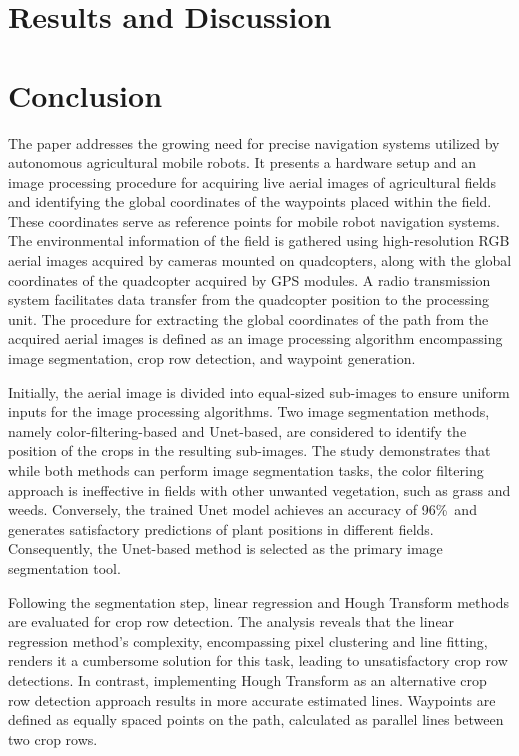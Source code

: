 \documentclass[conference]{IEEEtran}
\begin{document}
\section{Results and Discussion}\label{Results and Discussion}




\section{Conclusion}\label{Conclusion}
The paper addresses the growing need for precise navigation systems utilized by autonomous agricultural mobile robots. It presents a hardware setup and an image processing procedure for acquiring live aerial images of agricultural fields and identifying the global coordinates of the waypoints placed within the field. These coordinates serve as reference points for mobile robot navigation systems. The environmental information of the field is gathered using high-resolution RGB aerial images acquired by cameras mounted on quadcopters, along with the global coordinates of the quadcopter acquired by GPS modules. A radio transmission system facilitates data transfer from the quadcopter position to the processing unit. The procedure for extracting the global coordinates of the path from the acquired aerial images is defined as an image processing algorithm encompassing image segmentation, crop row detection, and waypoint generation.

Initially, the aerial image is divided into equal-sized sub-images to ensure uniform inputs for the image processing algorithms. Two image segmentation methods, namely color-filtering-based and Unet-based, are considered to identify the position of the crops in the resulting sub-images. The study demonstrates that while both methods can perform image segmentation tasks, the color filtering approach is ineffective in fields with other unwanted vegetation, such as grass and weeds. Conversely, the trained Unet model achieves an accuracy of 96\%\ and generates satisfactory predictions of plant positions in different fields. Consequently, the Unet-based method is selected as the primary image segmentation tool.

Following the segmentation step, linear regression and Hough Transform methods are evaluated for crop row detection. The analysis reveals that the linear regression method's complexity, encompassing pixel clustering and line fitting, renders it a cumbersome solution for this task, leading to unsatisfactory crop row detections. In contrast, implementing Hough Transform as an alternative crop row detection approach results in more accurate estimated lines. Waypoints are defined as equally spaced points on the path, calculated as parallel lines between two crop rows.
\end{document}
